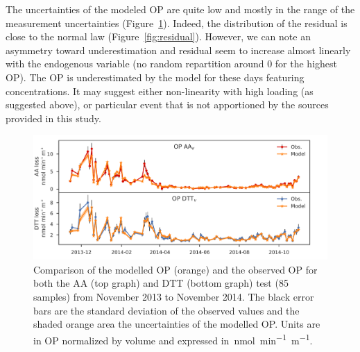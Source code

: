 \documentclass[acp, manuscript]{copernicus}
\begin{document}
The uncertainties of the modeled OP are quite low and mostly in the range of the
measurement uncertainties (Figure~\ref{fig:TSobsvsmodel}). Indeed, the
distribution of the residual is close to the normal law
(Figure~\ref{fig:residual}).  However, we can note an asymmetry toward
underestimation and residual seem to increase almost linearly with the
endogenous variable (no random repartition around 0 for the highest OP). The OP
is underestimated by the model for these days featuring concentrations. It may suggest
either non-linearity with high loading (as suggested above), or particular event
that is not apportioned by the sources provided in this study.

\begin{figure}[h]
    \centering
    \includegraphics[width=\textwidth]{figures/fig04}
    \caption{Comparison of the modelled OP (orange) and the observed OP for both
        the AA (top graph) and DTT (bottom graph) test (85 samples) from
        November 2013 to November 2014. The black error bars are the standard
        deviation of the observed values and the shaded orange area the
    uncertainties of the modelled OP.  Units are in OP normalized by volume
    and expressed in~\unit{nmol~min^{-1}~m^{-1}}.}
    \label{fig:TSobsvsmodel}
\end{figure}
\end{document}

